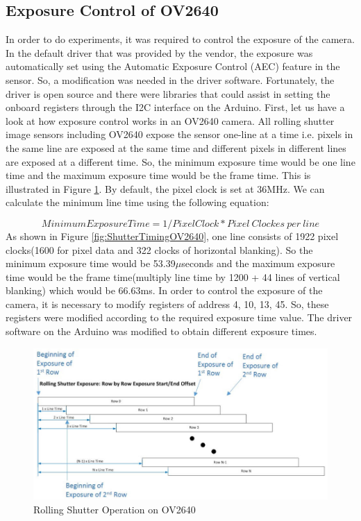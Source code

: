 \subsection{Exposure Control of OV2640}
In order to do experiments, it was required to control the exposure of the camera. In the default driver that was provided by the vendor, the exposure was automatically set using the Automatic Exposure Control (AEC) feature in the sensor. So, a modification was needed in the driver software. Fortunately, the driver is open source and there were libraries that could assist in setting the onboard registers through the I2C interface on the Arduino. First, let us have a look at how exposure control works in an OV2640 camera. All rolling shutter image sensors including OV2640 expose the sensor one-line at a time i.e. pixels in the same line are exposed at the same time and different pixels in different lines are exposed at a different time. So, the minimum exposure time would be one line time and the maximum exposure time would be the frame time. This is illustrated in Figure \ref{fig:RollingShutterOV2640}. By default, the pixel clock is set at 36MHz. We can calculate the minimum line time using the following equation:

$$
Minimum Exposure Time = 1/Pixel Clock * Pixel \ Clockes \ per \ line 
$$
As shown in Figure \ref{fig:ShutterTimingOV2640}, one line consists of 1922 pixel clocks(1600 for pixel data and 322 clocks of horizontal blanking). So the minimum exposure time would be 53.39$\mu$seconds and the maximum exposure time would be the frame time(multiply line time by 1200 + 44 lines of vertical blanking) which would be 66.63ms\cite{RollingShutterOV2640}. In order to control the exposure of the camera, it is necessary to modify registers of address 4, 10, 13, 45. So, these registers were modified according to the required exposure time value. The driver software on the Arduino was modified to obtain different exposure times.
\begin{figure}[ht]
\includegraphics[width=\textwidth]{pics/rolling_shutter}
\caption{Rolling Shutter Operation on OV2640\cite{RollingShutterOV2640}}
\label{fig:RollingShutterOV2640}
\end{figure}

